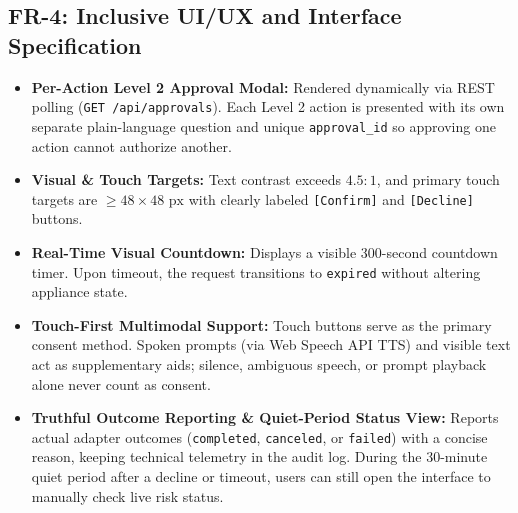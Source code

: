\documentclass[conference]{IEEEtran}
\begin{document}
\subsection{FR-4: Inclusive UI/UX and Interface Specification}
\begin{itemize}
    \item \textbf{Per-Action Level 2 Approval Modal:} Rendered dynamically via REST polling (\texttt{GET /api/approvals}). Each Level 2 action is presented with its own separate plain-language question and unique \texttt{approval\_id} so approving one action cannot authorize another.
    \item \textbf{Visual \& Touch Targets:} Text contrast exceeds $4.5:1$, and primary touch targets are $\ge 48 \times 48\text{ px}$ with clearly labeled \texttt{[Confirm]} and \texttt{[Decline]} buttons.
    \item \textbf{Real-Time Visual Countdown:} Displays a visible 300-second countdown timer. Upon timeout, the request transitions to \texttt{expired} without altering appliance state.
    \item \textbf{Touch-First Multimodal Support:} Touch buttons serve as the primary consent method. Spoken prompts (via Web Speech API TTS) and visible text act as supplementary aids; silence, ambiguous speech, or prompt playback alone never count as consent.
    \item \textbf{Truthful Outcome Reporting \& Quiet-Period Status View:} Reports actual adapter outcomes (\texttt{completed}, \texttt{canceled}, or \texttt{failed}) with a concise reason, keeping technical telemetry in the audit log. During the 30-minute quiet period after a decline or timeout, users can still open the interface to manually check live risk status.
\end{itemize}
\end{document}
